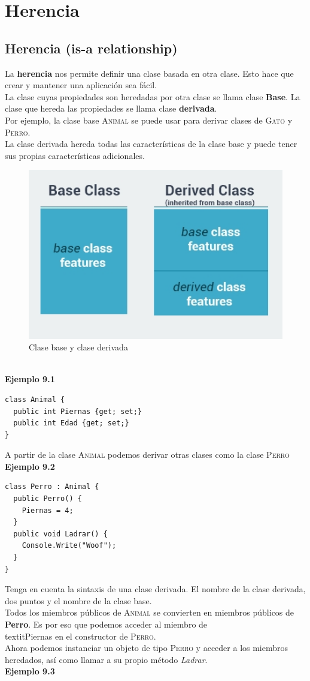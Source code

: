 \documentclass[12pt,a4paper]{report}
\begin{document}
\chapter{Herencia}
\section{Herencia (is-a relationship)}
La\textbf{ herencia} nos permite definir una clase basada en otra clase. Esto hace que crear y mantener una aplicación sea fácil.\\La clase cuyas propiedades son heredadas por otra clase se llama clase\textbf{ Base}. La clase que hereda las propiedades se llama clase\textbf{ derivada}.\\Por ejemplo, la clase base\textsc{ Animal} se puede usar para derivar clases de\textsc{ Gato} y\textsc{ Perro}.\\La clase derivada hereda todas las características de la clase base y puede tener sus propias características adicionales.
\begin{figure}[hbtp]
\centering
\includegraphics[width=12cm]{Csh_Imagenes/herencia.jpg}
\caption{Clase base y clase derivada}
\end{figure}
\\\textbf{Ejemplo 9.1}
\begin{lstlisting}
class Animal {
  public int Piernas {get; set;}
  public int Edad {get; set;}
}
\end{lstlisting}A partir de la clase\textsc{ Animal }podemos derivar otras clases como la clase \textsc{Perro}\\\textbf{Ejemplo 9.2}
\begin{lstlisting}
class Perro : Animal {
  public Perro() {
    Piernas = 4;
  }
  public void Ladrar() {
    Console.Write("Woof");
  }
}
\end{lstlisting}Tenga en cuenta la sintaxis de una clase derivada. El nombre de la clase derivada, dos puntos y el nombre de la clase base.\\Todos los miembros públicos de\textsc{ Animal} se convierten en miembros públicos de \textbf{Perro}. Es por eso que podemos acceder al miembro de \\textit{Piernas} en el constructor de \textsc{Perro}.\\Ahora podemos instanciar un objeto de tipo\textsc{ Perro} y acceder a los miembros heredados, así como llamar a su propio método \textit{Ladrar}.\\\textbf{Ejemplo 9.3}
\end{document}
